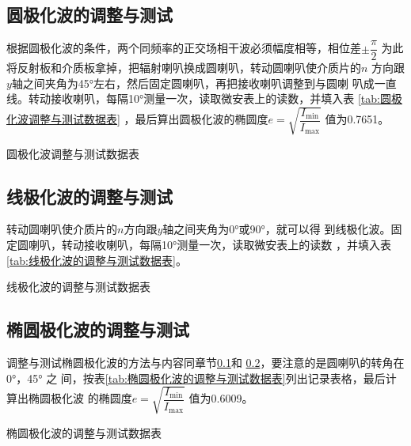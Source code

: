 \documentclass[../main]{subfiles}
\begin{document}
\subsection{圆极化波的调整与测试}%
\label{sub:圆极化波的调整与测试}

根据圆极化波的条件，两个同频率的正交场相干波必须幅度相等，相位差$ \pm \dfrac{\pi
}{2} $ 为此将反射板和介质板拿掉，把辐射喇叭换成圆喇叭，转动圆喇叭使介质片的$ n $
方向跟$ y $轴之间夹角为\ang{45;;}左右，然后固定圆喇叭，再把接收喇叭调整到与圆喇
叭成一直线。转动接收喇叭，每隔\ang{10;;}测量一次，读取微安表上的读数，并填入表
\ref{tab:圆极化波调整与测试数据表} ，最后算出圆极化波的椭圆度$ e =
\sqrt{\dfrac{I_\mathrm{min}}{I_\mathrm{max}}} $ 值为0.7651。

\begin{table}[htbp]
	\centering
	\caption{圆极化波调整与测试数据表}
	\label{tab:圆极化波调整与测试数据表}
\end{table}

\subsection{线极化波的调整与测试}%
\label{sub:线极化波的调整与测试}

转动圆喇叭使介质片的$ n $方向跟$ y $轴之间夹角为\ang{0;;}或\ang{90;;}，就可以得
到线极化波。固定圆喇叭，转动接收喇叭，每隔\ang{10;;}测量一次，读取微安表上的读数
，并填入表\ref{tab:线极化波的调整与测试数据表}。

\begin{table}[htbp]
	\centering
	\caption{线极化波的调整与测试数据表}
	\label{tab:线极化波的调整与测试数据表}
\end{table}

\subsection{椭圆极化波的调整与测试}%
\label{sub:椭圆极化波的调整与测试}

调整与测试椭圆极化波的方法与内容同章节\ref{sub:圆极化波的调整与测试}和
\ref{sub:线极化波的调整与测试}，要注意的是圆喇叭的转角在\ang{0;;}，\ang{45;;} 之
间，按表\ref{tab:椭圆极化波的调整与测试数据表}列出记录表格，最后计算出椭圆极化波
的椭圆度$ e = \sqrt{\dfrac{I_\mathrm{min}}{I_\mathrm{max}}} $ 值为0.6009。

\begin{table}[htbp]
	\centering
	\caption{椭圆极化波的调整与测试数据表}
	\label{tab:椭圆极化波的调整与测试数据表}
\end{table}
\end{document}
